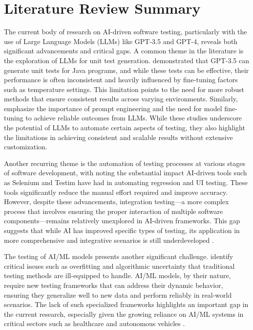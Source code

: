 \documentclass[12pt,a4paper]{article}
\begin{document}
\section{Literature Review Summary}
 
     The current body of research on AI-driven software testing, particularly with the use of Large Language Models (LLMs) like GPT-3.5 and GPT-4, reveals both significant advancements and critical gaps. A common theme in the literature is the exploration of LLMs for unit test generation. \citep{Guilherme23} demonstrated that GPT-3.5 can generate unit tests for Java programs, and while these tests can be effective, their performance is often inconsistent and heavily influenced by fine-tuning factors such as temperature settings. This limitation points to the need for more robust methods that ensure consistent results across varying environments. Similarly,\citep{Boukhlif24} emphasize the importance of prompt engineering and the need for model fine-tuning to achieve reliable outcomes from LLMs. While these studies underscore the potential of LLMs to automate certain aspects of testing, they also highlight the limitations in achieving consistent and scalable results without extensive customization.

     Another recurring theme is the automation of testing processes at various stages of software development, with \citep{Minimol21} noting the substantial impact AI-driven tools such as Selenium and Testim have had in automating regression and UI testing. These tools significantly reduce the manual effort required and improve accuracy. However, despite these advancements, integration testing—a more complex process that involves ensuring the proper interaction of multiple software components—remains relatively unexplored in AI-driven frameworks. This gap suggests that while AI has improved specific types of testing, its application in more comprehensive and integrative scenarios is still underdeveloped \citep{Minimol21}.


   The testing of AI/ML models presents another significant challenge. \citep{Kishore21} identify critical issues such as overfitting and algorithmic uncertainty that traditional testing methods are ill-equipped to handle. AI/ML models, by their nature, require new testing frameworks that can address their dynamic behavior, ensuring they generalize well to new data and perform reliably in real-world scenarios. The lack of such specialized frameworks highlights an important gap in the current research, especially given the growing reliance on AI/ML systems in critical sectors such as healthcare and autonomous vehicles \citep{Kishore21}.
\end{document}
